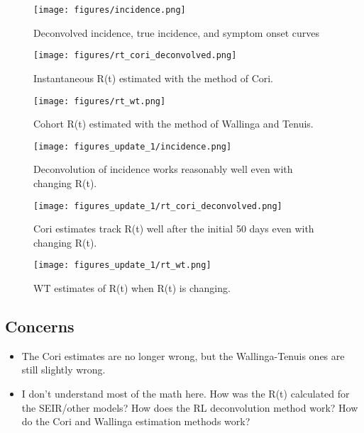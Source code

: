 \documentclass{article}
\begin{document}
\begin{figure}[h!]
    \centering
    \texttt{[image: figures/incidence.png]}
    \caption{Deconvolved incidence, true incidence, and symptom onset curves}
    \label{fig:my_label}
\end{figure}

\begin{figure}[h!]
    \centering
    \texttt{[image: figures/rt\_cori\_deconvolved.png]}
    \caption{Instantaneous R(t) estimated with the method of Cori.}
    \label{fig:my_label}
\end{figure}

\begin{figure}[h!]
    \centering
    \texttt{[image: figures/rt\_wt.png]}
    \caption{Cohort R(t) estimated with the method of Wallinga and Tenuis.}
    \label{fig:my_label}
\end{figure}

\begin{figure}[h!]
    \centering
    \texttt{[image: figures\_update\_1/incidence.png]}
    \caption{Deconvolution of incidence works reasonably well even with changing R(t).}
    \label{fig:my_label}
\end{figure}

\begin{figure}[h!]
    \centering
    \texttt{[image: figures\_update\_1/rt\_cori\_deconvolved.png]}
    \caption{Cori estimates track R(t) well after the initial 50 days even with changing R(t).}
    \label{fig:my_label}
\end{figure}

\begin{figure}[h!]
    \centering
    \texttt{[image: figures\_update\_1/rt\_wt.png]}
    \caption{WT estimates of R(t) when R(t) is changing.}
    \label{fig:my_label}
\end{figure}

\subsection{Concerns}
\begin{itemize}
    \item The Cori estimates are no longer wrong, but the Wallinga-Tenuis ones are still slightly wrong. 
    \item I don't understand most of the math here. How was the R(t) calculated for the SEIR/other models? How does the RL deconvolution method work? How do the Cori and Wallinga estimation methods work?
\end{itemize}
\end{document}
